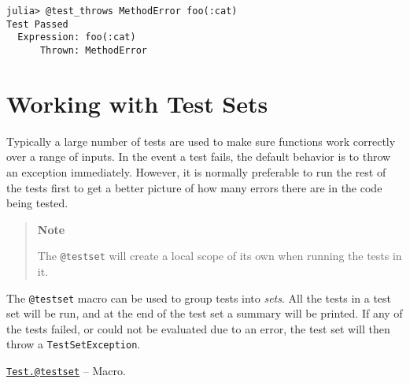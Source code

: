 \begin{verbatim}
julia> @test_throws MethodError foo(:cat)
Test Passed
  Expression: foo(:cat)
      Thrown: MethodError
\end{verbatim}



\hypertarget{12305239832165996459}{}


\section{Working with Test Sets}



Typically a large number of tests are used to make sure functions work correctly over a range of inputs. In the event a test fails, the default behavior is to throw an exception immediately. However, it is normally preferable to run the rest of the tests first to get a better picture of how many errors there are in the code being tested.



\begin{quote}
\textbf{Note}

The \texttt{@testset} will create a local scope of its own when running the tests in it.

\end{quote}


The \texttt{@testset} macro can be used to group tests into \emph{sets}. All the tests in a test set will be run, and at the end of the test set a summary will be printed. If any of the tests failed, or could not be evaluated due to an error, the test set will then throw a \texttt{TestSetException}.


\hypertarget{6603917731228482697}{}
\hyperlink{6603917731228482697}{\texttt{Test.@testset}}  -- {Macro.}

